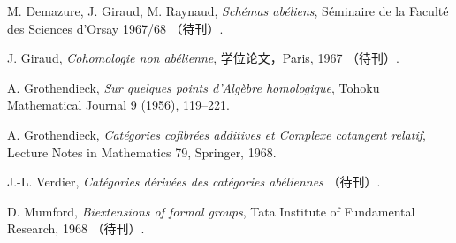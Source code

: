 \begin{enumerate}[label={[\arabic*]}]
\item M. Demazure, J. Giraud, M. Raynaud,
\emph{Schémas abéliens}, Séminaire de la Faculté des Sciences
d'Orsay 1967/68 （待刊）.
\item J. Giraud, \emph{Cohomologie non abélienne}, 学位论文，Paris,
1967 （待刊）.
\item A. Grothendieck, \emph{Sur quelques points d'Algèbre
homologique}, Tohoku Mathematical Journal 9 (1956), 119--221.
\item A. Grothendieck, \emph{Catégories cofibrées additives et
Complexe cotangent relatif}, Lecture Notes in Mathematics 79,
Springer, 1968.
\item J.-L. Verdier, \emph{Catégories dérivées des catégories
abéliennes} （待刊）.
\item D. Mumford, \emph{Biextensions of formal groups}, Tata
Institute of Fundamental Research, 1968 （待刊）.
\end{enumerate}

